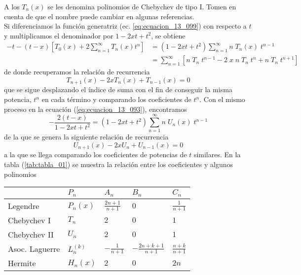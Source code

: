 A los $T_{n}(x)$ se les denomina polinomios de Chebychev de tipo I. Tomen en cuenta de que el nombre puede cambiar en algunas referencias.
\\
Si diferenciamos la función generatriz (ec. \ref{eq:ecuacion_13_099}) con respecto a $t$ y multiplicamos el denominador por $1 - 2xt + t^{2}$, se obtiene
\[ \begin{split}
- t - (t - x) \left[ T_{0}(x) +  2 \sum_{n=1}^{\infty} T_{n} (x) t^{n} \right] &= (1 - 2xt + t^{2}) \sum_{n=1}^{\infty} n \; T_{n}(x) \; t^{n-1} \\
&= \sum_{n=1}^{\infty} [ n \; T_{n} \; t^{n-1} - 2 \; x \; n \; T_{n} \; t^{n} + n \; T_{n} \; t^{n+1} ]
\end{split} \]
de donde recuperamos la relación de recurrencia
\begin{equation}
T_{n+1} (x) - 2 x T_{n} (x) + T_{n-1} (x) = 0
\label{eq:ecuacion_13_100}
\end{equation}
que se sigue desplazando el índice de suma con el fin de conseguir la misma potencia, $t^{n}$ en cada término y comparando los coeficientes de $t^{n}$. Con el mismo proceso en la ecuación (\ref{eq:ecuacion_13_093}), encontramos
\[ - \dfrac{2 (t - x)}{1 - 2xt + t^{2}} = (1 - 2xt + t^{2}) \sum_{n=1}^{\infty} n \; U_{n} (x) \; t^{n-1} \]
de la que se genera la siguiente relación de recurrencia
\begin{equation}
U_{n+1}(x) - 2 x U_{n} + U_{n-1} (x) = 0
\label{eq:ecuacion_13_101}
\end{equation}
a la que se llega comparando los coeficientes de potencias de $t$ similares. En la tabla (\ref{tab:tabla_01}) se muestra la relación entre los coeficientes y algunos polinomios
\begin{center}
\begin{tabular}{ p{4cm} | C{2cm} | C{2cm} | C{2cm} | C{2cm} }
\toprule
 & $P_{n}$ & $A_{n}$ & $B_{n}$ & $C_{n}$ \\ \hline
Legendre & $P_{n}(x)$ & $\frac{2n+1}{n+1}$ & $0$ & $\frac{1}{n+1}$ \\
Chebychev I & $T_{n}$ & $2$ & $0$ & $1$ \\
Chebychev II & $U_{n}$ & $2$ & $0$ & $1$ \\
Asoc. Laguerre & $L_{n}^{(k)} $ & $-\frac{1}{n+1}$ & $-\frac{2n+k+1}{n+1}$ & $\frac{n+k}{n+1}$ \\
Hermite & $H_{n}(x)$ & $2$ & $0$ & $2n$ \\
\bottomrule
\end{tabular}
\label{tab:tabla_01}
\end{center}
